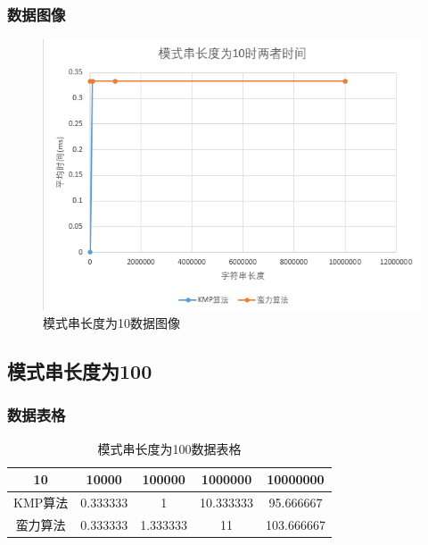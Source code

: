 \documentclass[UTF8]{ctexart}
\begin{document}
\subsubsection{数据图像}
\begin{figure}[h]
    \centering
    \includegraphics[scale=0.6]{10.png}
    \caption{模式串长度为10数据图像}
\end{figure}
\clearpage
\subsection{模式串长度为100}
\subsubsection{数据表格}
\begin{table}[h]
    \centering
    \begin{tabular}{|c|c|c|c|c|}
        \hline
        10&	10000&	100000&	1000000&	10000000\\
        \hline
        KMP算法&	0.333333&	1&	10.333333&	95.666667\\
        \hline
        蛮力算法&	0.333333&	1.333333&	11&	103.666667\\
        \hline
    \end{tabular}
    \caption{模式串长度为100数据表格}
\end{table}
\end{document}

